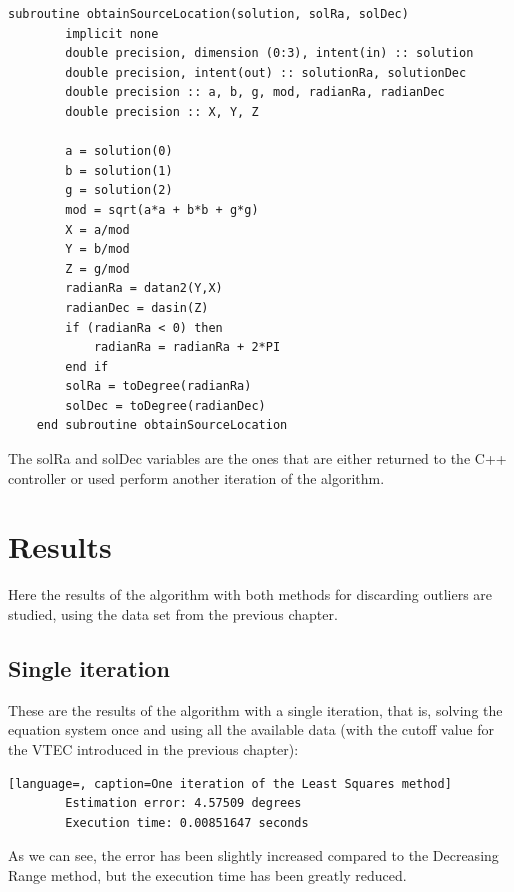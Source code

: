 \begin{minipage}{\linewidth}
	\label{lst:obtainSource}
	\begin{lstlisting}[style=myFortranStyle, caption=Obtaining the source's location using the system's solution]
	subroutine obtainSourceLocation(solution, solRa, solDec)
		implicit none
		double precision, dimension (0:3), intent(in) :: solution
		double precision, intent(out) :: solutionRa, solutionDec
		double precision :: a, b, g, mod, radianRa, radianDec
		double precision :: X, Y, Z
		
		a = solution(0)
		b = solution(1)
		g = solution(2)
		mod = sqrt(a*a + b*b + g*g)
		X = a/mod
		Y = b/mod
		Z = g/mod
		radianRa = datan2(Y,X)
		radianDec = dasin(Z)
		if (radianRa < 0) then
			radianRa = radianRa + 2*PI
		end if
		solRa = toDegree(radianRa)
		solDec = toDegree(radianDec)
	end subroutine obtainSourceLocation\end{lstlisting}
\end{minipage}

The solRa and solDec variables are the ones that are either returned to the C++ controller or used perform another iteration of the algorithm.

\section{Results}

Here the results of the algorithm with both methods for discarding outliers are studied, using the data set from the previous chapter.

\subsection{Single iteration}

These are the results of the algorithm with a single iteration, that is, solving the equation system once and using all the available data (with the cutoff value for the VTEC introduced in the previous chapter):

\begin{minipage}{\linewidth}
	\begin{lstlisting}[language=, caption=One iteration of the Least Squares method]
		Estimation error: 4.57509 degrees
		Execution time: 0.00851647 seconds\end{lstlisting}
\end{minipage}

As we can see, the error has been slightly increased compared to the Decreasing Range method, but the execution time has been greatly reduced.

